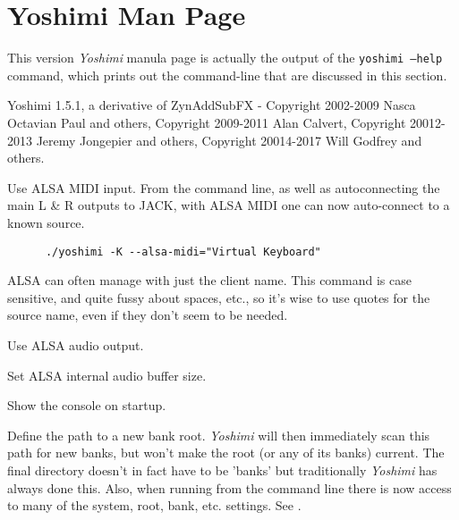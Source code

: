 %
%
%

\section{Yoshimi Man Page}
\label{sec:yoshimi_man_page}

   This version \textsl{Yoshimi} manula page is actually the output of the
   \texttt{yoshimi --help} command, which prints out the command-line that
   are discussed in this section.

   Yoshimi 1.5.1, a derivative of ZynAddSubFX - Copyright 2002-2009
   Nasca Octavian Paul and others, Copyright 2009-2011 Alan Calvert,
   Copyright 20012-2013 Jeremy Jongepier and others,
   Copyright 20014-2017 Will Godfrey and others.

   \setcounter{ItemCounter}{0}      %

      Use ALSA MIDI input.
      From the command line, as well as autoconnecting the main L \& R
      outputs to JACK, with ALSA MIDI one can now auto-connect to a known source.

   \begin{verbatim}
      ./yoshimi -K --alsa-midi="Virtual Keyboard"
   \end{verbatim}

      ALSA can often manage with just the client name.  This command is case
      sensitive, and quite fussy about spaces, etc., so it's wise to use
      quotes for the source name, even if they don't seem to be needed.

      Use ALSA audio output.

      Set ALSA internal audio buffer size.

      Show the console on startup.

      Define the path to a new bank root.
      \textsl{Yoshimi} will then immediately scan this path for new banks,
      but won't make the root (or any of its banks) current. The final
      directory doesn't in fact have to be 'banks' but traditionally
      \textsl{Yoshimi} has always done this.
      Also, when running from the command line there is now access to many of
      the system, root, bank, etc. settings.
      See .

